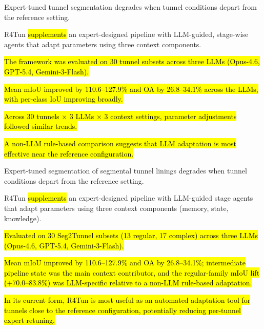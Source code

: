 \documentclass[a4paper,fleqn]{cas-dc}
\begin{document}
{%

\begin{highlights}

\item Expert-tuned tunnel segmentation degrades when tunnel conditions depart from the reference setting.
\item R4Tun \hl{supplements} an expert-designed pipeline with LLM-guided, stage-wise agents that adapt parameters using three context components.
\item \hl{The framework was evaluated on 30 tunnel subsets across three LLMs (Opus-4.6, GPT-5.4, Gemini-3-Flash).}
\item \hl{Mean mIoU improved by 110.6--127.9\% and OA by 26.8--34.1\% across the LLMs, with per-class IoU improving broadly.}
\item \hl{Across 30 tunnels $\times$ 3 LLMs $\times$ 3 context settings, parameter adjustments followed similar trends.}
\item \hl{A non-LLM rule-based comparison suggests that LLM adaptation is most effective near the reference configuration.}



\end{highlights}

\begin{highlights}
\item Expert-tuned segmentation of segmental tunnel linings degrades when tunnel conditions depart from the reference setting.
\item R4Tun \hl{supplements} an expert-designed pipeline with LLM-guided stage agents that adapt parameters using three context components (memory, state, knowledge).
\item \hl{Evaluated on 30 Seg2Tunnel subsets (13 regular, 17 complex) across three LLMs (Opus-4.6, GPT-5.4, Gemini-3-Flash).}
\item \hl{Mean mIoU improved by 110.6--127.9\% and OA by 26.8--34.1\%; intermediate pipeline state was the main context contributor, and the regular-family mIoU lift (+70.0--83.8\%) was LLM-specific relative to a non-LLM rule-based adaptation.}
\item \hl{In its current form, R4Tun is most useful as an automated adaptation tool for tunnels close to the reference configuration, potentially reducing per-tunnel expert retuning.}
\end{highlights}


}
\end{document}
